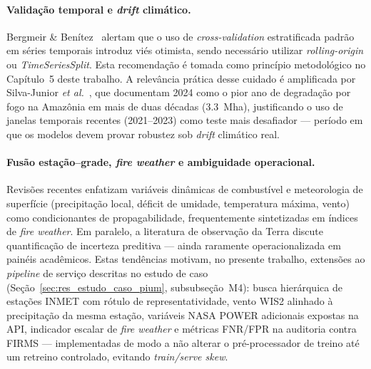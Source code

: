 \paragraph{Validação temporal e \emph{drift} climático.} Bergmeir \& Benítez~\cite{bergmeir2012cv} alertam que o uso de \emph{cross-validation} estratificada padrão em séries temporais introduz viés otimista, sendo necessário utilizar \emph{rolling-origin} ou \emph{TimeSeriesSplit}. Esta recomendação é tomada como princípio metodológico no Capítulo~5 deste trabalho. A relevância prática desse cuidado é amplificada por Silva-Junior \emph{et al.}~\cite{silvajunior2025amazon}, que documentam 2024 como o pior ano de degradação por fogo na Amazônia em mais de duas décadas (\SI{3,3}{\mega\hectare}), justificando o uso de janelas temporais recentes (2021--2023) como teste mais desafiador --- período em que os modelos devem provar robustez sob \emph{drift} climático real.

\paragraph{Fusão estação--grade, \emph{fire weather} e ambiguidade operacional.} Revisões recentes enfatizam variáveis dinâmicas de combustível e meteorologia de superfície (precipitação local, déficit de umidade, temperatura máxima, vento) como condicionantes de propagabilidade, frequentemente sintetizadas em índices de \emph{fire weather}. Em paralelo, a literatura de observação da Terra discute quantificação de incerteza preditiva --- ainda raramente operacionalizada em painéis acadêmicos. Estas tendências motivam, no presente trabalho, extensões ao \emph{pipeline} de serviço descritas no estudo de caso (Seção~\ref{sec:res_estudo_caso_pium}, subsubseção~M4): busca hierárquica de estações INMET com rótulo de representatividade, vento WIS2 alinhado à precipitação da mesma estação, variáveis NASA POWER adicionais expostas na API, indicador escalar de \emph{fire weather} e métricas FNR/FPR na auditoria contra FIRMS --- implementadas de modo a não alterar o pré-processador de treino até um retreino controlado, evitando \emph{train/serve skew}.
